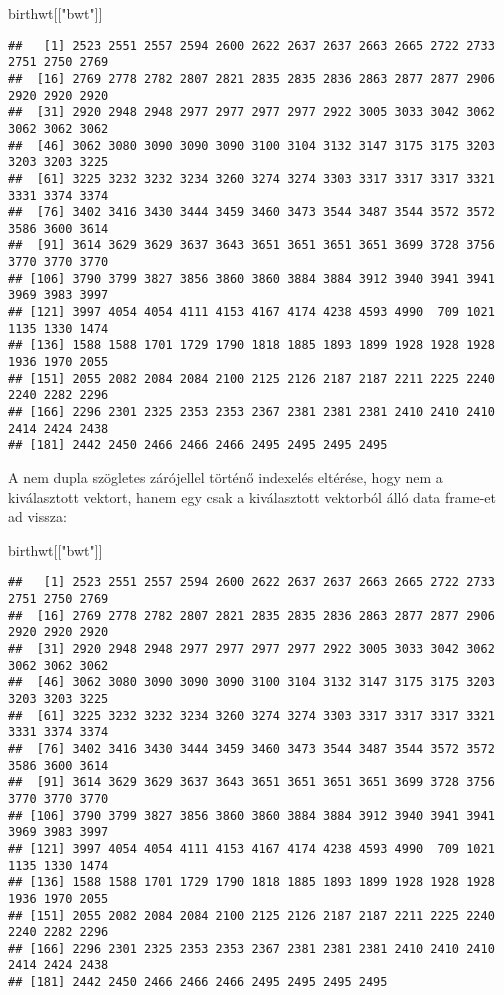 \documentclass[]{book}
\newenvironment{Shaded}{\begin{snugshade}}{\end{snugshade}}
\newcommand{\NormalTok}[1]{#1}
\newcommand{\StringTok}[1]{\textcolor[rgb]{0.31,0.60,0.02}{#1}}
\begin{document}
\begin{Shaded}
\begin{Highlighting}[]
\NormalTok{birthwt[[}\StringTok{"bwt"}\NormalTok{]]}
\end{Highlighting}
\end{Shaded}

\begin{verbatim}
##   [1] 2523 2551 2557 2594 2600 2622 2637 2637 2663 2665 2722 2733 2751 2750 2769
##  [16] 2769 2778 2782 2807 2821 2835 2835 2836 2863 2877 2877 2906 2920 2920 2920
##  [31] 2920 2948 2948 2977 2977 2977 2977 2922 3005 3033 3042 3062 3062 3062 3062
##  [46] 3062 3080 3090 3090 3090 3100 3104 3132 3147 3175 3175 3203 3203 3203 3225
##  [61] 3225 3232 3232 3234 3260 3274 3274 3303 3317 3317 3317 3321 3331 3374 3374
##  [76] 3402 3416 3430 3444 3459 3460 3473 3544 3487 3544 3572 3572 3586 3600 3614
##  [91] 3614 3629 3629 3637 3643 3651 3651 3651 3651 3699 3728 3756 3770 3770 3770
## [106] 3790 3799 3827 3856 3860 3860 3884 3884 3912 3940 3941 3941 3969 3983 3997
## [121] 3997 4054 4054 4111 4153 4167 4174 4238 4593 4990  709 1021 1135 1330 1474
## [136] 1588 1588 1701 1729 1790 1818 1885 1893 1899 1928 1928 1928 1936 1970 2055
## [151] 2055 2082 2084 2084 2100 2125 2126 2187 2187 2211 2225 2240 2240 2282 2296
## [166] 2296 2301 2325 2353 2353 2367 2381 2381 2381 2410 2410 2410 2414 2424 2438
## [181] 2442 2450 2466 2466 2466 2495 2495 2495 2495
\end{verbatim}

A nem dupla szögletes zárójellel történő indexelés eltérése, hogy nem a kiválasztott vektort, hanem egy csak a kiválasztott vektorból álló data frame-et ad vissza:

\begin{Shaded}
\begin{Highlighting}[]
\NormalTok{birthwt[[}\StringTok{"bwt"}\NormalTok{]]}
\end{Highlighting}
\end{Shaded}

\begin{verbatim}
##   [1] 2523 2551 2557 2594 2600 2622 2637 2637 2663 2665 2722 2733 2751 2750 2769
##  [16] 2769 2778 2782 2807 2821 2835 2835 2836 2863 2877 2877 2906 2920 2920 2920
##  [31] 2920 2948 2948 2977 2977 2977 2977 2922 3005 3033 3042 3062 3062 3062 3062
##  [46] 3062 3080 3090 3090 3090 3100 3104 3132 3147 3175 3175 3203 3203 3203 3225
##  [61] 3225 3232 3232 3234 3260 3274 3274 3303 3317 3317 3317 3321 3331 3374 3374
##  [76] 3402 3416 3430 3444 3459 3460 3473 3544 3487 3544 3572 3572 3586 3600 3614
##  [91] 3614 3629 3629 3637 3643 3651 3651 3651 3651 3699 3728 3756 3770 3770 3770
## [106] 3790 3799 3827 3856 3860 3860 3884 3884 3912 3940 3941 3941 3969 3983 3997
## [121] 3997 4054 4054 4111 4153 4167 4174 4238 4593 4990  709 1021 1135 1330 1474
## [136] 1588 1588 1701 1729 1790 1818 1885 1893 1899 1928 1928 1928 1936 1970 2055
## [151] 2055 2082 2084 2084 2100 2125 2126 2187 2187 2211 2225 2240 2240 2282 2296
## [166] 2296 2301 2325 2353 2353 2367 2381 2381 2381 2410 2410 2410 2414 2424 2438
## [181] 2442 2450 2466 2466 2466 2495 2495 2495 2495
\end{verbatim}
\end{document}
